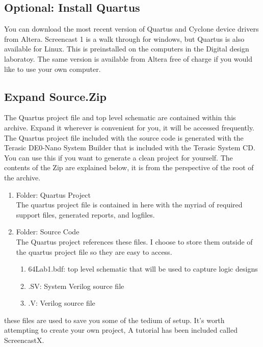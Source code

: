     \subsection{Optional: Install Quartus}
    You can download the most recent version of Quartus and Cyclone device drivers from Altera. Screencast 1
    is a walk through for windows, but Quartus is also available for Linux. This is preinstalled on the computers in the Digital design laboratoy. The same version is available from Altera free of charge if you would like to use your own computer.

    \subsection{Expand Source.Zip}
    The Quartus project file and top level schematic are contained within this archive. Expand it wherever is convenient for you, it will be accessed frequently. The Quartus project file included with the source code is generated with the Terasic DE0-Nano System Builder that is included with the Terasic System CD. You can use this if you want to generate a clean project for yourself. The contents of the Zip are explained below, it is from the perspective of the root of the archive.

    \begin{enumerate}
    \item Folder: Quartus Project \\
      The quartus project file is contained in here with the myriad of required support files, generated reports, and logfiles.
    \item Folder: Source Code \\
      The Quartus project references these files. I choose to store them outside of the quartus project file so they are easy to access.
      \begin{enumerate}
        \item 64Lab1.bdf: top level schematic that will be used to capture logic designs
        \item .SV: System Verilog source file
        \item .V: Verilog source file
      \end{enumerate}
    \end{enumerate}
    these files are used to save you some of the tedium of setup. It's worth attempting to create your own project, A tutorial has been included called ScreencastX.
    
